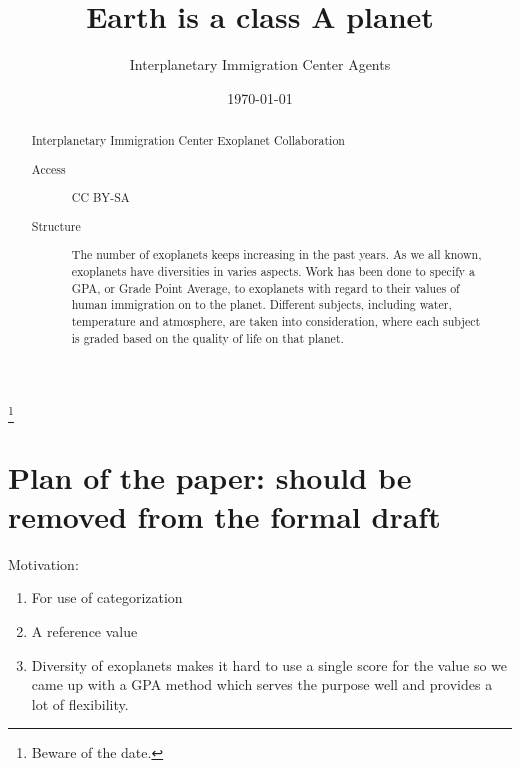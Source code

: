 \documentclass[%
 reprint,
 amsmath,amssymb,
 aps,
]{revtex4-1}
\begin{document}
\preprint{}

\title{Earth is a class A planet}%
\thanks{Beware of the date.}%

\author{Interplanetary Immigration Center Agents}
%


\date{\today}%

\begin{abstract}
Interplanetary Immigration Center Exoplanet Collaboration
\begin{description}
\item[Access] CC BY-SA
\item[Structure]
The number of exoplanets keeps increasing in the past years. As we all known, exoplanets have diversities in varies aspects. Work has been done to specify a GPA, or Grade Point Average, to exoplanets with regard to their values of human immigration on to the planet. Different subjects, including water, temperature and atmosphere, are taken into consideration, where each subject is graded based on the quality of life on that planet.
\end{description}
\end{abstract}

\maketitle


\section{Plan of the paper: should be removed from the formal draft}

Motivation:

\begin{enumerate}
  \item For use of categorization
  \item A reference value
  \item Diversity of exoplanets makes it hard to use a single score for the value so we came up with a GPA method which serves the purpose well and provides a lot of flexibility. 
\end{enumerate}
\end{document}
